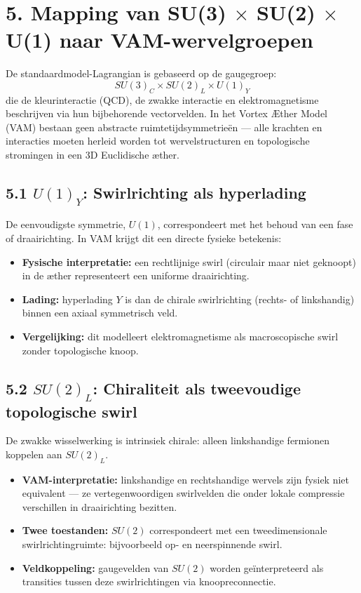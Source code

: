 \section*{5. Mapping van SU(3) \texorpdfstring{$\times$}{x} SU(2) \texorpdfstring{$\times$}{x} U(1) naar VAM-wervelgroepen}

De standaardmodel-Lagrangian is gebaseerd op de gaugegroep:
\[
    SU(3)_C \times SU(2)_L \times U(1)_Y
\]
die de kleurinteractie (QCD), de zwakke interactie en elektromagnetisme beschrijven via hun bijbehorende vectorvelden. In het Vortex \AE ther Model (VAM) bestaan geen abstracte ruimtetijdsymmetrieën — alle krachten en interacties moeten herleid worden tot wervelstructuren en topologische stromingen in een 3D Euclidische \ae ther.

\subsection*{5.1 $U(1)_Y$: Swirlrichting als hyperlading}
De eenvoudigste symmetrie, $U(1)$, correspondeert met het behoud van een fase of draairichting. In VAM krijgt dit een directe fysieke betekenis:
\begin{itemize}
    \item \textbf{Fysische interpretatie:} een rechtlijnige swirl (circulair maar niet geknoopt) in de \ae ther representeert een uniforme draairichting.
    \item \textbf{Lading:} hyperlading $Y$ is dan de chirale swirlrichting (rechts- of linkshandig) binnen een axiaal symmetrisch veld.
    \item \textbf{Vergelijking:} dit modelleert elektromagnetisme als macroscopische swirl zonder topologische knoop.
\end{itemize}

\subsection*{5.2 $SU(2)_L$: Chiraliteit als tweevoudige topologische swirl}
De zwakke wisselwerking is intrinsiek chirale: alleen linkshandige fermionen koppelen aan $SU(2)_L$.
\begin{itemize}
    \item \textbf{VAM-interpretatie:} linkshandige en rechtshandige wervels zijn fysiek niet equivalent — ze vertegenwoordigen swirlvelden die onder lokale compressie verschillen in draairichting bezitten.
    \item \textbf{Twee toestanden:} $SU(2)$ correspondeert met een tweedimensionale swirlrichtingruimte: bijvoorbeeld op- en neerspinnende swirl.
    \item \textbf{Veldkoppeling:} gaugevelden van $SU(2)$ worden geïnterpreteerd als transities tussen deze swirlrichtingen via knoopreconnectie.
\end{itemize}

